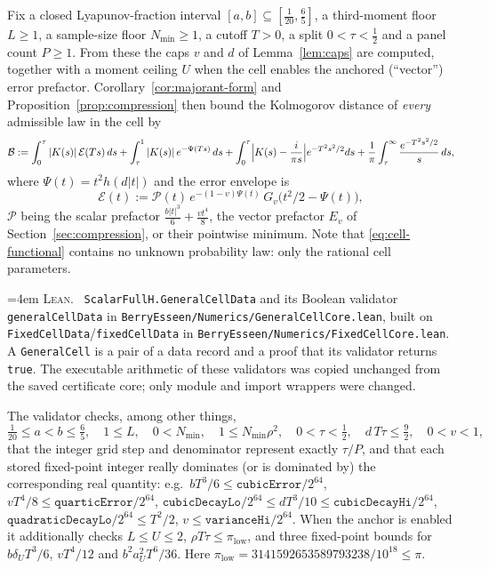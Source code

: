 \documentclass[10pt,a4paper]{article}
\theoremstyle{plain}
\theoremstyle{definition}
\newcommand{\lean}[1]{\texttt{#1}}
\newcommand{\file}[1]{\texttt{#1}}
\newenvironment{leanref}%
  {\par\addvspace{3pt}\begingroup\sloppy\emergencystretch=4em
   \noindent\footnotesize\textsc{Lean.}\ \ignorespaces}%
  {\par\endgroup\addvspace{3pt}}
\begin{document}
Fix a closed Lyapunov-fraction interval $[a,b]\subseteq[\tfrac1{20},\tfrac65]$,
a third-moment floor $L\ge1$, a sample-size floor $N_{\min}\ge1$, a cutoff
$T>0$, a split $0<\tau<\tfrac12$ and a panel count $P\ge1$. From these the
caps $v$ and $d$ of Lemma~\ref{lem:caps} are computed, together with a moment
ceiling $U$ when the cell enables the anchored (``vector'') error prefactor.
Corollary~\ref{cor:majorant-form} and Proposition~\ref{prop:compression} then
bound the Kolmogorov distance of \emph{every} admissible law in the cell by
\begin{equation}\label{eq:cell-functional}
  \mathcal B :=
  \int_0^\tau |K(s)|\,\mathcal E(Ts)\,ds
  + \int_\tau^1 |K(s)|\,e^{-\Psi(Ts)}\,ds
  + \int_0^\tau \Bigl|K(s)-\frac{i}{\pi s}\Bigr| e^{-T^2s^2/2}ds
  + \frac1\pi\int_\tau^\infty \frac{e^{-T^2s^2/2}}{s}\,ds ,
\end{equation}
where $\Psi(t)=t^2h(d|t|)$ and the error envelope is
\[
  \mathcal E(t) := \mathcal P(t)\,
  e^{-(1-v)\Psi(t)}\,G_v\bigl(t^2/2-\Psi(t)\bigr),
\]
$\mathcal P$ being the scalar prefactor $\tfrac{b|t|^3}{6}+\tfrac{v t^4}{8}$,
the vector prefactor $E_v$ of Section~\ref{sec:compression}, or their pointwise
minimum. Note that \eqref{eq:cell-functional} contains no unknown probability
law: only the rational cell parameters.

\begin{leanref}
\lean{ScalarFullH.GeneralCellData} and its Boolean validator
\lean{generalCellData} in
\file{BerryEsseen/Numerics/GeneralCellCore.lean}, built on
\lean{FixedCellData}/\lean{fixedCellData} in
\file{BerryEsseen/Numerics/FixedCellCore.lean}. A \lean{GeneralCell} is a pair
of a data record and a proof that its validator returns \lean{true}. The
executable arithmetic of these validators was copied unchanged from the saved
certificate core; only module and import wrappers were changed.
\end{leanref}

The validator checks, among other things,
\[
  \tfrac1{20}\le a<b\le\tfrac65,\quad 1\le L,\quad 0<N_{\min},\quad
  1\le N_{\min}\rho^2,\quad 0<\tau<\tfrac12,\quad
  d\,T\tau\le\tfrac92,\quad 0<v<1,
\]
that the integer grid step and denominator represent exactly $\tau/P$, and that
each stored fixed-point integer really dominates (or is dominated by) the
corresponding real quantity: e.g.\ $bT^3/6\le\lean{cubicError}/2^{64}$,
$vT^4/8\le\lean{quarticError}/2^{64}$,
$\lean{cubicDecayLo}/2^{64}\le dT^3/10\le\lean{cubicDecayHi}/2^{64}$,
$\lean{quadraticDecayLo}/2^{64}\le T^2/2$, $v\le\lean{varianceHi}/2^{64}$. When
the anchor is enabled it additionally checks $L\le U\le2$,
$\rho T\tau\le\pi_{\mathrm{low}}$, and three fixed-point bounds for
$b\delta_UT^3/6$, $vT^4/12$ and $b^2a_U^2T^6/36$. Here
$\pi_{\mathrm{low}}=3141592653589793238/10^{18}\le\pi$.
\end{document}
